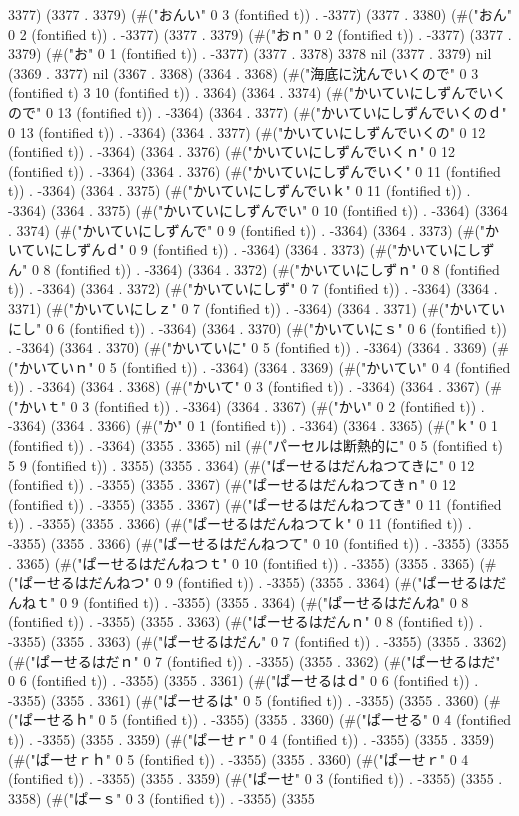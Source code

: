 3377) (3377 . 3379) (#("おんい" 0 3 (fontified t)) . -3377) (3377 . 3380) (#("おん" 0 2 (fontified t)) . -3377) (3377 . 3379) (#("おｎ" 0 2 (fontified t)) . -3377) (3377 . 3379) (#("お" 0 1 (fontified t)) . -3377) (3377 . 3378) 3378 nil (3377 . 3379) nil (3369 . 3377) nil (3367 . 3368) (3364 . 3368) (#("海底に沈んでいくので" 0 3 (fontified t) 3 10 (fontified t)) . 3364) (3364 . 3374) (#("かいていにしずんでいくので" 0 13 (fontified t)) . -3364) (3364 . 3377) (#("かいていにしずんでいくのｄ" 0 13 (fontified t)) . -3364) (3364 . 3377) (#("かいていにしずんでいくの" 0 12 (fontified t)) . -3364) (3364 . 3376) (#("かいていにしずんでいくｎ" 0 12 (fontified t)) . -3364) (3364 . 3376) (#("かいていにしずんでいく" 0 11 (fontified t)) . -3364) (3364 . 3375) (#("かいていにしずんでいｋ" 0 11 (fontified t)) . -3364) (3364 . 3375) (#("かいていにしずんでい" 0 10 (fontified t)) . -3364) (3364 . 3374) (#("かいていにしずんで" 0 9 (fontified t)) . -3364) (3364 . 3373) (#("かいていにしずんｄ" 0 9 (fontified t)) . -3364) (3364 . 3373) (#("かいていにしずん" 0 8 (fontified t)) . -3364) (3364 . 3372) (#("かいていにしずｎ" 0 8 (fontified t)) . -3364) (3364 . 3372) (#("かいていにしず" 0 7 (fontified t)) . -3364) (3364 . 3371) (#("かいていにしｚ" 0 7 (fontified t)) . -3364) (3364 . 3371) (#("かいていにし" 0 6 (fontified t)) . -3364) (3364 . 3370) (#("かいていにｓ" 0 6 (fontified t)) . -3364) (3364 . 3370) (#("かいていに" 0 5 (fontified t)) . -3364) (3364 . 3369) (#("かいていｎ" 0 5 (fontified t)) . -3364) (3364 . 3369) (#("かいてい" 0 4 (fontified t)) . -3364) (3364 . 3368) (#("かいて" 0 3 (fontified t)) . -3364) (3364 . 3367) (#("かいｔ" 0 3 (fontified t)) . -3364) (3364 . 3367) (#("かい" 0 2 (fontified t)) . -3364) (3364 . 3366) (#("か" 0 1 (fontified t)) . -3364) (3364 . 3365) (#("ｋ" 0 1 (fontified t)) . -3364) (3355 . 3365) nil (#("パーセルは断熱的に" 0 5 (fontified t) 5 9 (fontified t)) . 3355) (3355 . 3364) (#("ぱーせるはだんねつてきに" 0 12 (fontified t)) . -3355) (3355 . 3367) (#("ぱーせるはだんねつてきｎ" 0 12 (fontified t)) . -3355) (3355 . 3367) (#("ぱーせるはだんねつてき" 0 11 (fontified t)) . -3355) (3355 . 3366) (#("ぱーせるはだんねつてｋ" 0 11 (fontified t)) . -3355) (3355 . 3366) (#("ぱーせるはだんねつて" 0 10 (fontified t)) . -3355) (3355 . 3365) (#("ぱーせるはだんねつｔ" 0 10 (fontified t)) . -3355) (3355 . 3365) (#("ぱーせるはだんねつ" 0 9 (fontified t)) . -3355) (3355 . 3364) (#("ぱーせるはだんねｔ" 0 9 (fontified t)) . -3355) (3355 . 3364) (#("ぱーせるはだんね" 0 8 (fontified t)) . -3355) (3355 . 3363) (#("ぱーせるはだんｎ" 0 8 (fontified t)) . -3355) (3355 . 3363) (#("ぱーせるはだん" 0 7 (fontified t)) . -3355) (3355 . 3362) (#("ぱーせるはだｎ" 0 7 (fontified t)) . -3355) (3355 . 3362) (#("ぱーせるはだ" 0 6 (fontified t)) . -3355) (3355 . 3361) (#("ぱーせるはｄ" 0 6 (fontified t)) . -3355) (3355 . 3361) (#("ぱーせるは" 0 5 (fontified t)) . -3355) (3355 . 3360) (#("ぱーせるｈ" 0 5 (fontified t)) . -3355) (3355 . 3360) (#("ぱーせる" 0 4 (fontified t)) . -3355) (3355 . 3359) (#("ぱーせｒ" 0 4 (fontified t)) . -3355) (3355 . 3359) (#("ぱーせｒｈ" 0 5 (fontified t)) . -3355) (3355 . 3360) (#("ぱーせｒ" 0 4 (fontified t)) . -3355) (3355 . 3359) (#("ぱーせ" 0 3 (fontified t)) . -3355) (3355 . 3358) (#("ぱーｓ" 0 3 (fontified t)) . -3355) (3355 